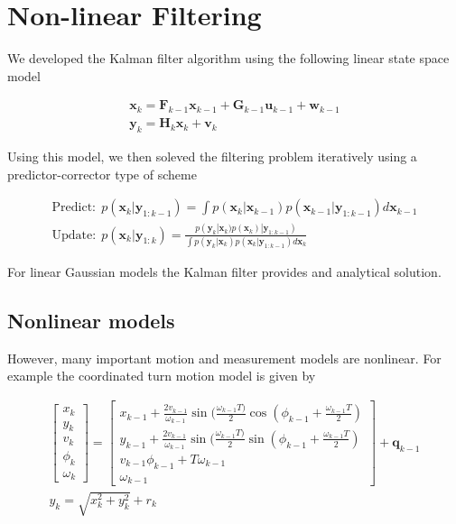 \section{Non-linear Filtering}
\label{non_linear_filtering}

We developed the Kalman filter algorithm using the following linear state space model

\begin{eqnarray}
\mathbf{x}_k = \mathbf{F}_{k-1}\mathbf{x}_{k-1} + \mathbf{G}_{k-1}\mathbf{u}_{k-1} + \mathbf{w}_{k-1} \\
\mathbf{y}_k = \mathbf{H}_k \mathbf{x}_k + \mathbf{v}_k
\end{eqnarray}

Using this model, we then soleved the filtering problem iteratively using a predictor-corrector type of scheme

\begin{eqnarray}
\text{Predict:}~~ p(\mathbf{x}_k|\mathbf{y}_{1:k-1}) = \int p(\mathbf{x}_k|\mathbf{x}_{k-1})p(\mathbf{x}_{k-1}|\mathbf{y}_{1:k-1}) d \mathbf{x}_{k-1} \\
\text{Update:}~~ p(\mathbf{x}_k|\mathbf{y}_{1:k}) = \frac{p(\mathbf{y}_k|\mathbf{x}_{k})p(\mathbf{x}_{k}) | \mathbf{y}_{1:k-1})}{\int p(\mathbf{y}_k|\mathbf{x}_{k})p(\mathbf{x}_{k}|\mathbf{y}_{1:k-1}) d \mathbf{x}_{k}}
\end{eqnarray}

For linear Gaussian models the Kalman filter provides and analytical solution.


\subsection{Nonlinear models}

However, many important motion and measurement models are nonlinear. For example the coordinated turn motion model is given by

\begin{eqnarray}
\begin{bmatrix}
x_k \\
y_k \\
v_k \\
\phi_k \\
\omega_k
\end{bmatrix} = 
\begin{bmatrix}
x_{k-1} + \frac{2v_{k-1}}{\omega_{k-1}}\sin(\frac{\omega_{k-1}T)}{2}\cos(\phi_{k-1} + \frac{\omega_{k-1}T}{2}) \\
y_{k-1} + \frac{2v_{k-1}}{\omega_{k-1}}\sin(\frac{\omega_{k-1}T)}{2}\sin(\phi_{k-1} + \frac{\omega_{k-1}T}{2}) \\
v_{k-1}
\phi_{k-1} + T \omega_{k-1} \\
\omega_{k-1}
\end{bmatrix} + \mathbf{q}_{k-1} \\
y_k = \sqrt{x_{k}^2 + y_{k}^2} + r_k
\end{eqnarray}

